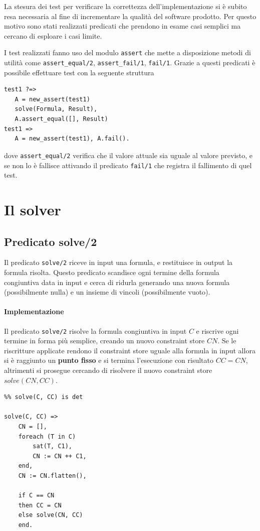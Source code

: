 \documentclass[12pt,a4paper,openright]{book} %
\begin{document}
La stesura dei test per verificare la correttezza dell'implementazione si è subito resa necessaria al fine di incrementare la qualità del software prodotto. Per questo motivo sono stati realizzati predicati che prendono in esame casi semplici ma cercano di esploare i casi limite.

I test realizzati fanno uso del modulo \verb|assert| che mette a disposizione metodi di utilità come \verb|assert_equal/2|, \verb|assert_fail/1|, \verb|fail/1|. Grazie a questi predicati è possibile effettuare test con la seguente struttura
\begin{verbatim}
test1 ?=>
   A = new_assert(test1)
   solve(Formula, Result),
   A.assert_equal([], Result)
test1 => 
   A = new_assert(test1), A.fail().
\end{verbatim}
dove \verb|assert_equal/2| verifica che il valore attuale sia uguale al valore previsto, e se non lo è fallisce attivando il predicato \verb|fail/1| che registra il fallimento di quel test.

\section{Il solver}

\subsection{Predicato solve/2}

Il predicato \verb|solve/2| riceve in input una formula, e restituisce in output la formula risolta. Questo predicato scandisce ogni termine della formula congiuntiva data in input e cerca di ridurla generando una nuova formula (possibilmente nulla) e un insieme di vincoli (possibilmente vuoto).

\paragraph{Implementazione} Il predicato \verb|solve/2| risolve la formula congiuntiva in input $C$ e riscrive ogni termine in forma più semplice, creando un nuovo constraint store $CN$. Se le riscritture applicate rendono il constraint store uguale alla formula in input allora si è raggiunto un \textbf{punto fisso} e si termina l'esecuzione con risultato $CC = CN$, altrimenti si prosegue cercando di risolvere il nuovo constraint store $solve(CN, CC)$.
\begin{verbatim}
%% solve(C, CC) is det

solve(C, CC) =>
    CN = [],
    foreach (T in C)
        sat(T, C1), 
        CN := CN ++ C1,
    end,
    CN := CN.flatten(),
   
    if C == CN 
    then CC = CN 
    else solve(CN, CC)
    end.
\end{verbatim}
\end{document}

